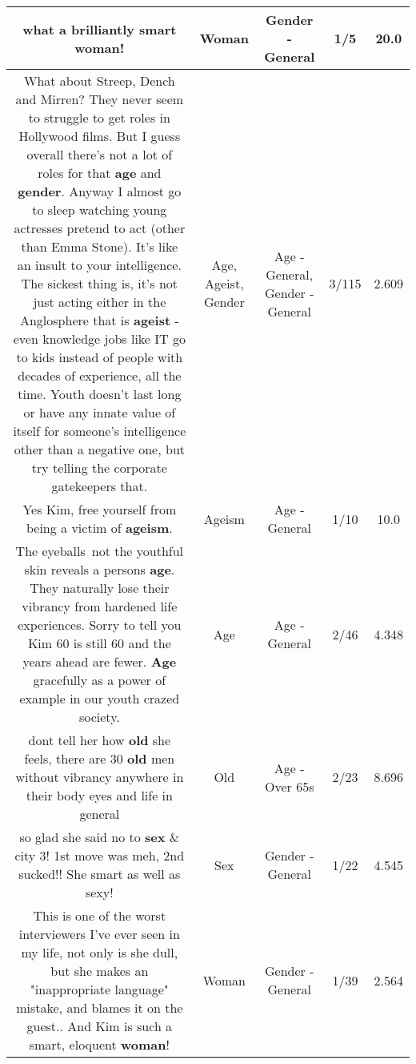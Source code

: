 \documentclass[11pt]{article}
\newlength\mylength
\begin{document}
\begin{center}
\begin{longtable}{|C{.65\mylength}|C{.30\mylength}|C{.12\mylength}|C{.12\mylength}|C{.12\mylength}|}
  \small what a brilliantly smart \textbf{woman}!\normalsize   & Woman & Gender - General & 1/5 & 20.0 \\  \hline
  \small What about Streep, Dench and Mirren? They never seem to struggle to get roles in Hollywood films. But I guess overall there's not a lot of roles for that \textbf{age} and \textbf{gender}. Anyway I almost go to sleep watching young actresses pretend to act (other than Emma Stone). It's like an insult to your intelligence. The sickest thing is, it's not just acting either in the Anglosphere that is \textbf{ageist} - even knowledge jobs like IT go to kids instead of people with decades of experience, all the time. Youth doesn't last long or have any innate value of itself for someone's intelligence other than a negative one, but try telling the corporate gatekeepers that.\normalsize   & Age, Ageist, Gender & Age - General, Gender - General & 3/115 & 2.609 \\  \hline
  \small Yes Kim, free yourself from being a victim of \textbf{ageism}.\normalsize   & Ageism & Age - General & 1/10 & 10.0 \\  \hline
  \small The eyeballs not the youthful skin reveals a persons \textbf{age}. They naturally lose their vibrancy from hardened life experiences. Sorry to tell you Kim 60 is still 60 and the years ahead are fewer. \textbf{Age} gracefully as a power of example in our youth crazed society.\normalsize   & Age & Age - General & 2/46 & 4.348 \\  \hline
  \small dont tell her how \textbf{old} she feels, there are 30 \textbf{old} men without vibrancy anywhere in their body eyes and life in general\normalsize   & Old & Age - Over 65s & 2/23 & 8.696 \\  \hline
  \small so glad she said no to \textbf{sex} \& city 3! 1st move was meh, 2nd sucked!! She smart as well as sexy!\normalsize   & Sex & Gender - General & 1/22 & 4.545 \\  \hline
  \small This is one of the worst interviewers I've ever seen in my life, not only is she dull, but she makes an "inappropriate language" mistake, and blames it on the guest.. And Kim is such a smart, eloquent \textbf{woman}!\normalsize   & Woman & Gender - General & 1/39 & 2.564 \\  \hline

\end{longtable}
\end{center}
\end{document}
